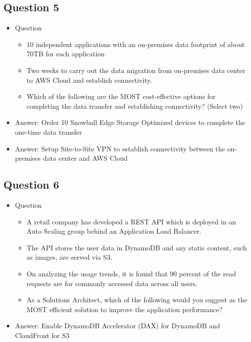 \documentclass[]{scrartcl}
\begin{document}
\subsection{Question 5}
\begin{itemize}
	\item Question 
	\begin{itemize}
		\item 10 independent applications with an on-premises data footprint of about 70TB for each application
		\item Two weeks to carry out the data migration from on-premises data center to AWS Cloud and establish connectivity.
		\item Which of the following are the MOST cost-effective options for completing the data transfer and establishing connectivity? (Select two)
	\end{itemize}
	\item Answer: Order 10 Snowball Edge Storage Optimized devices to complete the one-time data transfer
	\item Answer: Setup Site-to-Site VPN to establish connectivity between the on-premises data center and AWS Cloud
\end{itemize}

\subsection{Question 6}
\begin{itemize}
	\item Question
	\begin{itemize}
		\item A retail company has developed a REST API which is deployed in an Auto Scaling group behind an Application Load Balancer. 
		\item The API stores the user data in DynamoDB and any static content, such as images, are served via S3. \item On analyzing the usage trends, it is found that 90 percent of the read requests are for commonly accessed data across all users.
		\item As a Solutions Architect, which of the following would you suggest as the MOST efficient solution to improve the application performance?
	\end{itemize}
	\item Answer: Enable DynamoDB Accelerator (DAX) for DynamoDB and CloudFront for S3
\end{itemize}
\end{document}
